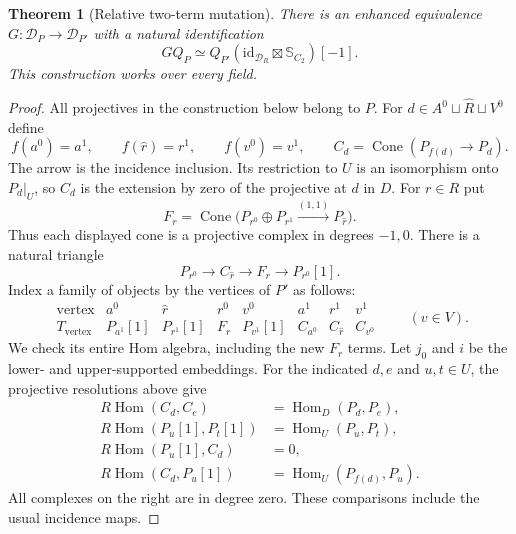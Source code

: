 \documentclass[11pt]{article}
\newtheorem{theorem}{Theorem}[section]
\theoremstyle{definition}
\newcommand{\Hom}{\operatorname{Hom}}
\begin{document}
\begin{theorem}[Relative two-term mutation]\label{thm:relative-mutation}
There is an enhanced equivalence $G:\mathcal D_P\to\mathcal D_{P'}$
with a natural identification
\begin{equation}\label{eq:mutation-boundary}
 GQ_P\simeq Q_{P'}
       (\mathrm{id}_{\mathcal D_R}\boxtimes\mathbb S_{C_2})[-1].
\end{equation}
This construction works over every field.
\end{theorem}
\begin{proof}
All projectives in the construction below belong to $P$.
For $d\in A^0\sqcup\widehat R\sqcup V^0$ define
\[
 f(a^0)=a^1,\qquad f(\widehat r)=r^1,\qquad f(v^0)=v^1,
 \qquad C_d=\operatorname{Cone}(P_{f(d)}\longrightarrow P_d).
\]
The arrow is the incidence inclusion. Its restriction to $U$ is
an isomorphism onto $P_d|_U$, so $C_d$ is the extension by zero of
the projective at $d$ in $D$. For $r\in R$ put
\[
 F_r=\operatorname{Cone}
   \bigl(P_{r^0}\oplus P_{r^1}
                      \xrightarrow{(1,1)} P_{\widehat r}\bigr).
\]
Thus each displayed cone is a projective complex in degrees $-1,0$.
There is a natural triangle
\begin{equation}\label{eq:mutation-F-triangle}
 P_{r^0}\longrightarrow C_{\widehat r}\longrightarrow F_r
                              \longrightarrow P_{r^0}[1].
\end{equation}
Index a family of objects by the vertices of $P'$ as follows:
\[
\begin{array}{c|ccccccc}
 \text{vertex}&a^0&\widehat r&r^0&v^0&a^1&r^1&v^1\\\hline
 T_{\text{vertex}}&P_{a^1}[1]&P_{r^1}[1]&F_r&P_{v^1}[1]
                    &C_{a^0}&C_{\widehat r}&C_{v^0}
\end{array}
\qquad(v\in V).
\]
We check its entire Hom algebra, including the new $F_r$ terms.
Let $j_0$ and $i$ be the lower- and upper-supported embeddings.
For the indicated $d,e$ and $u,t\in U$, the projective resolutions
above give
\begin{align*}
 R\Hom(C_d,C_e)&=\Hom_D(P_d,P_e),\\
 R\Hom(P_u[1],P_t[1])&=\Hom_U(P_u,P_t),\\
 R\Hom(P_u[1],C_d)&=0,\\
 R\Hom(C_d,P_u[1])&=\Hom_U(P_{f(d)},P_u).
\end{align*}
All complexes on the right are in degree zero. These comparisons
include the usual incidence maps.


\end{proof}
\end{document}
